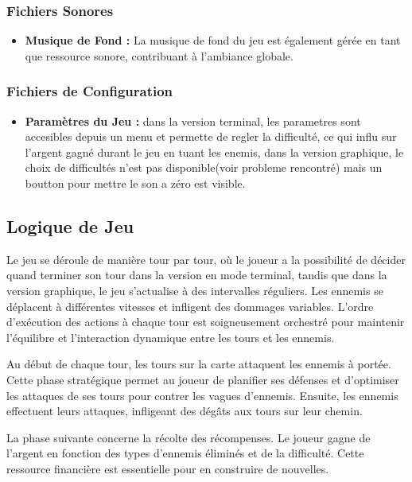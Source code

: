 \documentclass{article}
\begin{document}
\subsubsection*{Fichiers Sonores}

\begin{itemize}
    \item \textbf{Musique de Fond :} La musique de fond du jeu est également gérée en tant que ressource sonore, contribuant à l'ambiance globale.
\end{itemize}

\subsubsection*{Fichiers de Configuration}

\begin{itemize}
    \item \textbf{Paramètres du Jeu :} dans la version terminal, les parametres sont accesibles depuis un menu et permette de regler la difficulté, ce qui influ sur l'argent gagné durant le jeu en tuant les enemis, dans la version graphique, le choix de difficultés n'est pas disponible(voir probleme rencontré) mais un boutton pour mettre le son a zéro est visible.
\end{itemize}


\subsection*{Logique de Jeu}
Le jeu se déroule de manière tour par tour, où le joueur a la possibilité de décider quand terminer son tour dans la version en mode terminal, tandis que dans la version graphique, le jeu s'actualise à des intervalles réguliers. Les ennemis se déplacent à différentes vitesses et infligent des dommages variables. L'ordre d'exécution des actions à chaque tour est soigneusement orchestré pour maintenir l'équilibre et l'interaction dynamique entre les tours et les ennemis.

Au début de chaque tour, les tours sur la carte attaquent les ennemis à portée. Cette phase stratégique permet au joueur de planifier ses défenses et d'optimiser les attaques de ses tours pour contrer les vagues d'ennemis. Ensuite, les ennemis effectuent leurs attaques, infligeant des dégâts aux tours sur leur chemin.

La phase suivante concerne la récolte des récompenses. Le joueur gagne de l'argent en fonction des types d'ennemis éliminés et de la difficulté. Cette ressource financière est essentielle pour en construire de nouvelles.
\end{document}
